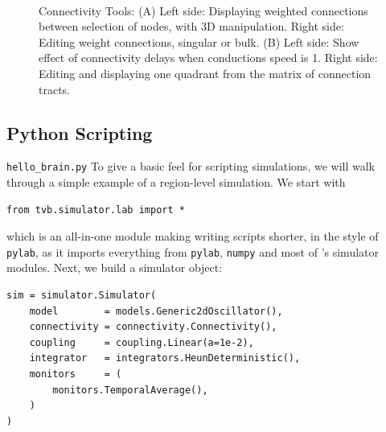  \begin{figure}[!htbp]
 	\centering
	\\
	\caption{Connectivity Tools: 
	(A) Left side: Displaying weighted connections between selection of nodes, with 3D manipulation.
	Right side: Editing weight connections, singular or bulk.
	(B) Left side: Show effect of connectivity delays when conductions speed is 1.
	Right side: Editing and displaying one quadrant from the matrix of connection tracts.}
        \label{fig:connectivity}
\end{figure}



\subsection{Python Scripting}

\texttt{hello\_brain.py}
To give a basic feel for scripting \TVB simulations, we will 
walk through a simple example of a region-level simulation. We 
start with

\begin{lstlisting}
from tvb.simulator.lab import *
\end{lstlisting}

\noindent which is an all-in-one module making writing scripts
shorter, in the style of \texttt{pylab}, as it imports everything
from \texttt{pylab}, \texttt{numpy} and most of \TVB's simulator
modules. Next, we build a simulator object:

\begin{lstlisting}
sim = simulator.Simulator(
    model        = models.Generic2dOscillator(), 
    connectivity = connectivity.Connectivity(),
    coupling     = coupling.Linear(a=1e-2),
    integrator   = integrators.HeunDeterministic(),
    monitors     = (
        monitors.TemporalAverage(), 
    )
)
\end{lstlisting}


